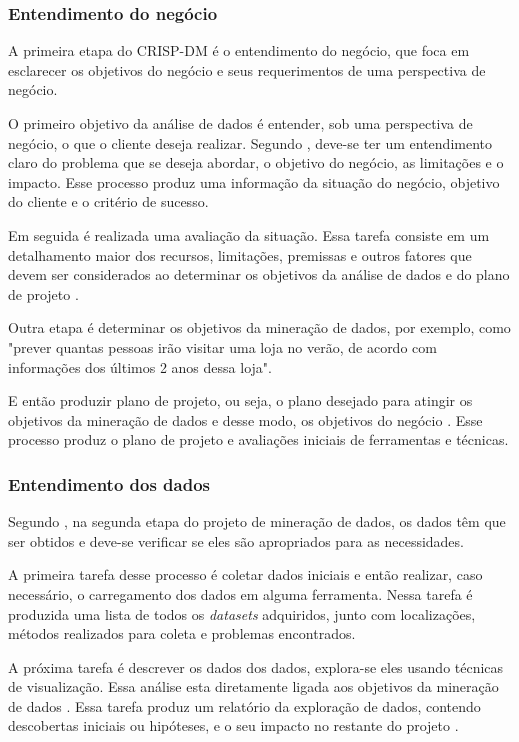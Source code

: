 \subsubsection{Entendimento do negócio}
A primeira etapa do CRISP-DM é o entendimento do negócio, que foca em esclarecer os objetivos do negócio e seus requerimentos de uma perspectiva de negócio.

O primeiro objetivo da análise de dados é entender, sob uma perspectiva de negócio, o que o cliente deseja realizar. Segundo , deve-se ter um entendimento claro do problema que se deseja abordar, o objetivo do negócio, as limitações e o impacto. Esse processo produz uma informação da situação do negócio, objetivo do cliente e o critério de sucesso.

Em seguida é realizada uma avaliação da situação. Essa tarefa consiste em um detalhamento maior dos recursos, limitações, premissas e outros fatores que devem ser considerados ao determinar os objetivos da análise de dados e do plano de projeto \citep{crispmanual}.

Outra etapa é determinar os objetivos da mineração de dados, por exemplo, como "prever quantas pessoas irão visitar uma loja no verão, de acordo com informações dos últimos 2 anos dessa loja".

E então produzir plano de projeto, ou seja, o plano desejado para atingir os objetivos da mineração de dados e desse modo, os objetivos do negócio \citep{crispmanual}. Esse processo produz o plano de projeto e avaliações iniciais de ferramentas e técnicas.

\subsubsection{Entendimento dos dados}
Segundo , na segunda etapa do projeto de mineração de dados, os dados têm que ser obtidos e deve-se verificar se eles são apropriados para as necessidades.

A primeira tarefa desse processo é coletar dados iniciais e então realizar, caso necessário, o carregamento dos dados em alguma ferramenta. Nessa tarefa é produzida uma lista de todos os \textit{datasets} adquiridos, junto com localizações, métodos realizados para coleta e problemas encontrados.

A próxima tarefa é descrever os dados dos dados, explora-se eles usando técnicas de visualização. Essa análise esta diretamente ligada aos objetivos da mineração de dados \citep{crispmanual}. Essa tarefa produz um relatório da exploração de dados, contendo descobertas iniciais ou hipóteses, e o seu impacto no restante do projeto \citep{crispmanual}.

